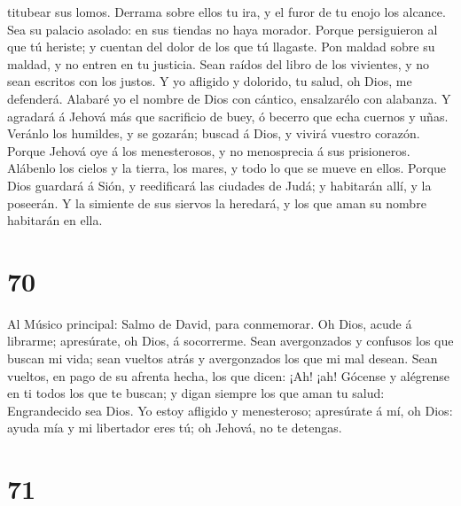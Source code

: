 titubear sus lomos.  Derrama sobre ellos tu ira, y el
furor de tu enojo los alcance.  Sea su palacio asolado:
en sus tiendas no haya morador.  Porque persiguieron al
que tú heriste; y cuentan del dolor de los que tú llagaste.
 Pon maldad sobre su maldad, y no entren en tu justicia.
 Sean raídos del libro de los vivientes, y no sean
escritos con los justos.  Y yo afligido y dolorido, tu
salud, oh Dios, me defenderá.  Alabaré yo el nombre de
Dios con cántico, ensalzarélo con alabanza.  Y agradará á
Jehová más que sacrificio de buey, ó becerro que echa cuernos y uñas.
 Veránlo los humildes, y se gozarán; buscad á Dios, y
vivirá vuestro corazón.  Porque Jehová oye á los
menesterosos, y no menosprecia á sus prisioneros. 
Alábenlo los cielos y la tierra, los mares, y todo lo que se mueve en
ellos.  Porque Dios guardará á Sión, y reedificará las
ciudades de Judá; y habitarán allí, y la poseerán.  Y la
simiente de sus siervos la heredará, y los que aman su nombre habitarán
en ella.

\hypertarget{section-69}{%
\section{70}\label{section-69}}

 Al Músico principal: Salmo de David, para conmemorar. Oh
Dios, acude á librarme; apresúrate, oh Dios, á socorrerme.
 Sean avergonzados y confusos los que buscan mi vida; sean
vueltos atrás y avergonzados los que mi mal desean.  Sean
vueltos, en pago de su afrenta hecha, los que dicen: ¡Ah! ¡ah!
 Gócense y alégrense en ti todos los que te buscan; y
digan siempre los que aman tu salud: Engrandecido sea Dios.
 Yo estoy afligido y menesteroso; apresúrate á mí, oh
Dios: ayuda mía y mi libertador eres tú; oh Jehová, no te detengas.

\hypertarget{section-70}{%
\section{71}\label{section-70}}

